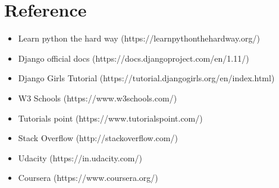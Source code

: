\documentclass{article}
\begin{document}
\newpage


\section{Reference}
\vspace{1em}
\begin{itemize}
\item Learn python the hard way (https://learnpythonthehardway.org/)
\item Django official docs (https://docs.djangoproject.com/en/1.11/)
\item Django Girls Tutorial (https://tutorial.djangogirls.org/en/index.html)
\item W3 Schools (https://www.w3schools.com/)
\item Tutorials point (https://www.tutorialspoint.com/)
\item Stack Overflow (http://stackoverflow.com/)
\item Udacity (https://in.udacity.com/)
\item Coursera (https://www.coursera.org/)
\end{itemize}


\newpage
\end{document}
